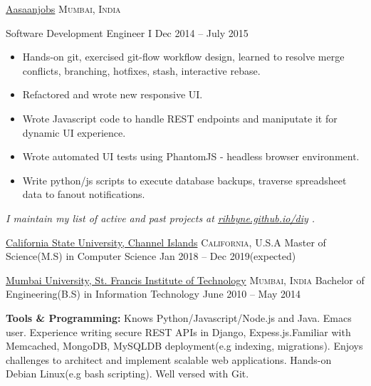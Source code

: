 \documentclass[10pt,a4paper]{article}
\begin{document}
\headedsection
    {\href{https://www.aasaanjobs.com/}{Aasaanjobs}}
    {\textsc{Mumbai, India}}
    {%
      \headedsubsection
      {Software Development Engineer I}
      {Dec 2014 -- July 2015}
      {
        \begin{itemize}
          \item Hands-on git, exercised git-flow workflow design, learned to resolve merge conflicts, branching, hotfixes, stash, interactive rebase.
          \item Refactored and wrote new responsive UI.
          \item Wrote Javascript code to handle REST endpoints and maniputate it for dynamic UI experience.
          \item Wrote automated UI tests using PhantomJS - headless browser environment.
          \item Write python/js scripts to execute database backups, traverse spreadsheet data to fanout notifications.
        \end{itemize}
      }
    }

\vspace{-0.2em}
\begin{center}
  \emph{\small I maintain my list of active and past projects at \href{http://rihbyne.github.io/diy}{rihbyne.github.io/diy} .}
\end{center}


\spacedhrule{-0.2em}{-0.4em}


\headedsection
  {\href{https://www.csuci.edu/}{California State University, Channel Islands}}
  {\textsc{California, U.S.A}} {%
  \headedsubsection
    {Master of Science(M.S) in Computer Science}
    {Jan 2018 -- Dec 2019(expected)} {}
}

\headedsection
  {\href{http://www.mu.ac.in/}{Mumbai University, St. Francis Institute of Technology}}
  {\textsc{Mumbai, India}} {%
  \headedsubsection
    {Bachelor of Engineering(B.S) in Information Technology}
    {June 2010 -- May 2014} {}
}

\spacedhrule{0.5em}{-0.4em}


\inlineheadedsection
{\textbf{Tools \& Programming:}}
{Knows Python/\nsp Javascript/\nsp Node.js} and Java. Emacs user. Experience writing secure REST APIs in Django, Expess.js.Familiar with Memcached, MongoDB, MySQLDB deployment(e.g indexing, migrations). Enjoys challenges to architect and implement scalable web applications. Hands-on Debian Linux(e.g bash scripting). Well versed with Git.
\end{document}
